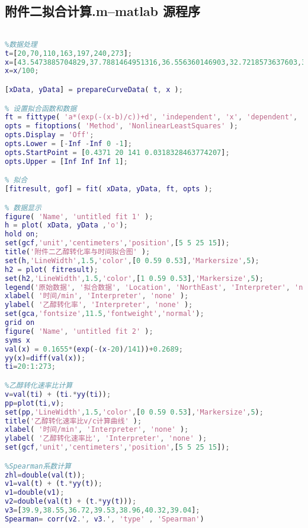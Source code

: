 \documentclass[withoutpreface,bwprint]{cumcmthesis} %
\begin{document}
\begin{appendices}
\section{附件二拟合计算.m--matlab 源程序}
\begin{lstlisting}[language=matlab]
%附件二乙醇转化率与时间拟合与乙醇转化速率比计算

%数据处理
t=[20,70,110,163,197,240,273];
x=[43.5473885704829,37.7881464951316,36.556360146903,32.7218573637603,31.7100969883427,29.8542302857545,29.9060085761557];
x=x/100;

[xData, yData] = prepareCurveData( t, x );

% 设置拟合函数和数据
ft = fittype( 'a*(exp(-(x-b)/c))+d', 'independent', 'x', 'dependent', 'y' );
opts = fitoptions( 'Method', 'NonlinearLeastSquares' );
opts.Display = 'Off';
opts.Lower = [-Inf -Inf 0 -1];
opts.StartPoint = [0.4371 20 141 0.0318328463774207];
opts.Upper = [Inf Inf Inf 1];

% 拟合
[fitresult, gof] = fit( xData, yData, ft, opts );

% 数据显示
figure( 'Name', 'untitled fit 1' );
h = plot( xData, yData ,'o');
hold on;
set(gcf,'unit','centimeters','position',[5 5 25 15]);
title('附件二乙醇转化率与时间拟合图' );
set(h,'LineWidth',1.5,'color',[0 0.59 0.53],'Markersize',5);
h2 = plot( fitresult);
set(h2,'LineWidth',1.5,'color',[1 0.59 0.53],'Markersize',5);
legend('原始数据', '拟合数据', 'Location', 'NorthEast', 'Interpreter', 'none' );
xlabel( '时间/min', 'Interpreter', 'none' );
ylabel( '乙醇转化率', 'Interpreter', 'none' );
set(gca,'fontsize',11.5,'fontweight','normal');
grid on
figure( 'Name', 'untitled fit 2' );
syms x
val(x) = 0.1655*(exp(-(x-20)/141))+0.2689;
yy(x)=diff(val(x));
ti=20:1:273;

%乙醇转化速率比计算
v=val(ti) + (ti.*yy(ti));
pp=plot(ti,v);
set(pp,'LineWidth',1.5,'color',[0 0.59 0.53],'Markersize',5);
title('乙醇转化速率比v/c计算曲线' );
xlabel( '时间/min', 'Interpreter', 'none' );
ylabel( '乙醇转化速率比', 'Interpreter', 'none' );
set(gcf,'unit','centimeters','position',[5 5 25 15]);

%Spearman系数计算
zhl=double(val(t));
v1=val(t) + (t.*yy(t)); 
v1=double(v1);
v2=double(val(t) + (t.*yy(t)));
v3=[39.9,38.55,36.72,39.53,38.96,40.32,39.04];
Spearman= corr(v2.', v3.', 'type' , 'Spearman')	
\end{lstlisting}



\end{appendices}
\end{document}

